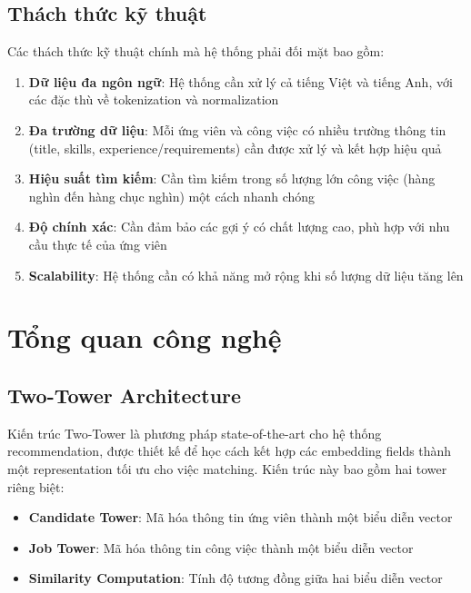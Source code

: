 \subsection{Thách thức kỹ thuật}

Các thách thức kỹ thuật chính mà hệ thống phải đối mặt bao gồm:

\begin{enumerate}
    \item \textbf{Dữ liệu đa ngôn ngữ}: Hệ thống cần xử lý cả tiếng Việt và tiếng Anh, với các đặc thù về tokenization và normalization
    \item \textbf{Đa trường dữ liệu}: Mỗi ứng viên và công việc có nhiều trường thông tin (title, skills, experience/requirements) cần được xử lý và kết hợp hiệu quả
    \item \textbf{Hiệu suất tìm kiếm}: Cần tìm kiếm trong số lượng lớn công việc (hàng nghìn đến hàng chục nghìn) một cách nhanh chóng
    \item \textbf{Độ chính xác}: Cần đảm bảo các gợi ý có chất lượng cao, phù hợp với nhu cầu thực tế của ứng viên
    \item \textbf{Scalability}: Hệ thống cần có khả năng mở rộng khi số lượng dữ liệu tăng lên
\end{enumerate}

\section{Tổng quan công nghệ}

\subsection{Two-Tower Architecture}

Kiến trúc Two-Tower là phương pháp state-of-the-art cho hệ thống recommendation, được thiết kế để học cách kết hợp các embedding fields thành một representation tối ưu cho việc matching. Kiến trúc này bao gồm hai tower riêng biệt:

\begin{itemize}
    \item \textbf{Candidate Tower}: Mã hóa thông tin ứng viên thành một biểu diễn vector
    \item \textbf{Job Tower}: Mã hóa thông tin công việc thành một biểu diễn vector
    \item \textbf{Similarity Computation}: Tính độ tương đồng giữa hai biểu diễn vector
\end{itemize}

